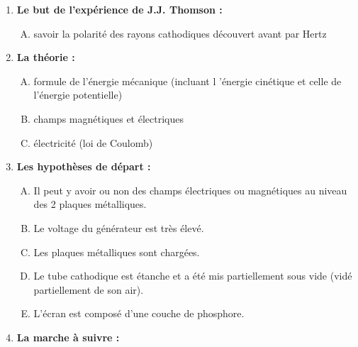 \documentclass[../main.tex]{subfiles}
\begin{document}
\begin{enumerate}[I]
    \item \textbf{Le but de l'expérience de J.J. Thomson :}
    \begin{enumerate}[A.]
        \item savoir la polarité des rayons cathodiques découvert avant par Hertz
    \end{enumerate}
    \item \textbf {La théorie :}
    \begin{enumerate}[A.]
        \item formule de l'énergie mécanique (incluant l 'énergie cinétique et celle de l'énergie potentielle)
        \item champs magnétiques et électriques
        \item électricité (loi de Coulomb) 
    \end{enumerate}
    \item \textbf {Les hypothèses de départ :}
    \begin{enumerate}[A.]
        \item Il peut y avoir ou non des champs électriques ou magnétiques au niveau des 2 plaques métalliques.
        \item Le voltage du générateur est très élevé.
        \item Les plaques métalliques sont chargées.
        \item Le tube cathodique est étanche et a été mis partiellement sous vide (vidé partiellement de son air).
        \item L'écran est composé d'une couche de phosphore.
    \end{enumerate}
    \item \textbf{La marche à suivre :}
    

\end{enumerate}
\end{document}
